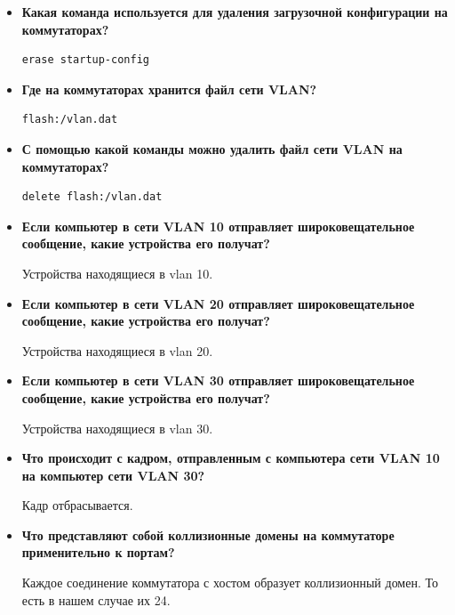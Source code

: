 \documentclass[a4paper,14pt]{extarticle}
\begin{document}
\begin{enumerate}
\begin{itemize}
            \item \textbf{Какая команда используется для удаления загрузочной конфигурации на коммутаторах?}\par
            \begin{lstlisting}
erase startup-config
            \end{lstlisting}

            \item \textbf{Где на коммутаторах хранится файл сети VLAN?}\par
            \begin{lstlisting}
flash:/vlan.dat
            \end{lstlisting}

            \item \textbf{С помощью какой команды можно удалить файл сети VLAN на коммутаторах?}\par
            \begin{lstlisting}
delete flash:/vlan.dat
            \end{lstlisting}

            \item \textbf{Если компьютер в сети VLAN 10 отправляет широковещательное сообщение, какие устройства его получат?}\par
               Устройства находящиеся в vlan 10. 

            \item \textbf{Если компьютер в сети VLAN 20 отправляет широковещательное сообщение, какие устройства его получат?}\par
               Устройства находящиеся в vlan 20. 

            \item \textbf{Если компьютер в сети VLAN 30 отправляет широковещательное сообщение, какие устройства его получат?}\par
               Устройства находящиеся в vlan 30. 

            \item \textbf{Что происходит с кадром, отправленным с компьютера сети VLAN 10 на компьютер сети VLAN 30?}\par
                Кадр отбрасывается.

            \item \textbf{Что представляют собой коллизионные домены на коммутаторе применительно к портам?}\par
                Каждое соединение коммутатора с хостом образует коллизионный домен. То есть в нашем случае их 24.


\end{itemize}
\end{enumerate}
\end{document}
